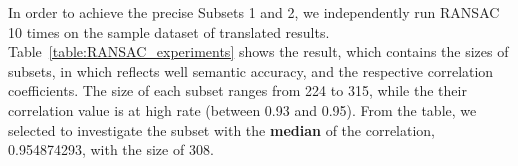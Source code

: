 
%







In order to achieve the precise Subsets 1 and 2, we independently run
RANSAC 10 times on the sample dataset of translated
results. Table~\ref{table:RANSAC_experiments} shows the result, which
contains the sizes of subsets, in which {\model} reflects well
semantic accuracy, and the respective correlation coefficients.
%
The size of each subset ranges from 224 to 315, while the their
correlation value is at high rate (between 0.93 and 0.95).  From the
table, we selected to investigate the subset with the \textbf{median}
of the correlation, 0.954874293, with the size of 308.

